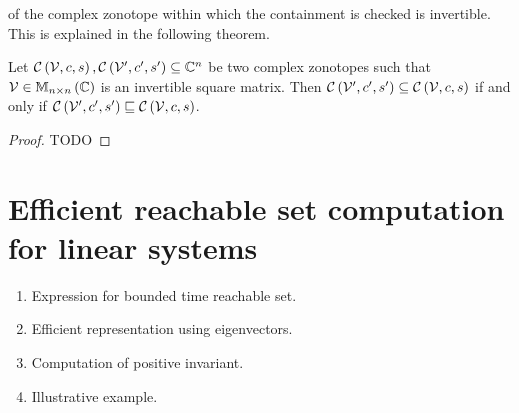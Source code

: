 of the complex zonotope within which the containment is checked is
invertible.  This is explained in the following theorem.
%
\begin{theorem}
Let
$\mathit{\mathcal{C}}\left(\mathcal{V},c,s\right),\mathit{\mathcal{C}}\left(\mathcal{V}^\prime,c^\prime,s^\prime\right)\subseteq\mathbb{C}^n$
be two complex zonotopes such that $\mathcal{V}\in\mathbb{M}_{n\times n}\left(\mathbb{C}\right)$ is
an invertible square matrix.  Then
$\mathit{\mathcal{C}}\left(\mathcal{V}^\prime,c^\prime,s^\prime\right)\subseteq\mathit{\mathcal{C}}\left(\mathcal{V},c,s\right)$
if and only if $\mathit{\mathcal{C}}\left(\mathcal{V}^\prime,c^\prime,s^\prime\right)\sqsubseteq\mathit{\mathcal{C}}\left(\mathcal{V},c,s\right)$.
\end{theorem}
%
\begin{proof}
{\color{red} TODO}
\end{proof}

\section{Efficient reachable set computation for linear systems}

{\color{red}
\begin{enumerate}
\item Expression for bounded time reachable set.
\item Efficient representation using eigenvectors.
\item Computation of positive invariant.
\item Illustrative example.
\end{enumerate}
}
